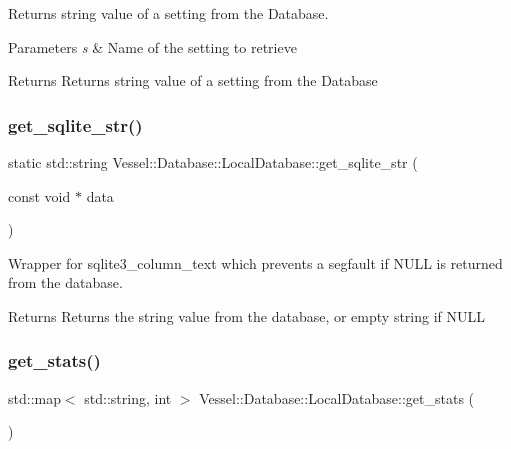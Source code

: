 Returns string value of a setting from the Database. 


\begin{DoxyParams}{Parameters}
{\em s} & Name of the setting to retrieve \\
\hline
\end{DoxyParams}
\begin{DoxyReturn}{Returns}
Returns string value of a setting from the Database 
\end{DoxyReturn}
\mbox{\label{class_vessel_1_1_database_1_1_local_database_a1561145d386751e09b23b80a723735c4}} 
\subsubsection{\texorpdfstring{get\+\_\+sqlite\+\_\+str()}{get\_sqlite\_str()}}
{\footnotesize\ttfamily static std\+::string Vessel\+::\+Database\+::\+Local\+Database\+::get\+\_\+sqlite\+\_\+str (\begin{DoxyParamCaption}\item[{const void $\ast$}]{data }\end{DoxyParamCaption})\hspace{0.3cm}{\ttfamily [static]}}



Wrapper for sqlite3\+\_\+column\+\_\+text which prevents a segfault if N\+U\+LL is returned from the database. 

\begin{DoxyReturn}{Returns}
Returns the string value from the database, or empty string if N\+U\+LL 
\end{DoxyReturn}
\mbox{\label{class_vessel_1_1_database_1_1_local_database_ab55e12266822635ba8d4e74b9ca17a7d}} 
\subsubsection{\texorpdfstring{get\+\_\+stats()}{get\_stats()}}
{\footnotesize\ttfamily std\+::map$<$ std\+::string, int $>$ Vessel\+::\+Database\+::\+Local\+Database\+::get\+\_\+stats (\begin{DoxyParamCaption}{ }\end{DoxyParamCaption})}

